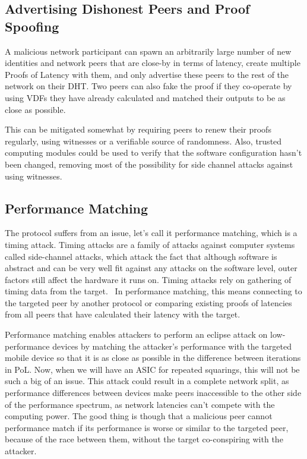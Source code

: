 \subsection{Advertising Dishonest Peers and Proof Spoofing}
A malicious network participant can spawn an arbitrarily large number of new identities and network peers that are close-by in terms of latency, create multiple Proofs of Latency with them, and only advertise these peers to the rest of the network on their DHT. Two peers can also fake the proof if they co-operate by using VDFs they have already calculated and matched their outputs to be as close as possible.

This can be mitigated somewhat by requiring peers to renew their proofs regularly, using witnesses or a verifiable source of randomness. Also, trusted computing modules could be used to verify that the software configuration hasn't been changed, removing most of the possibility for side channel attacks against using witnesses.

\subsection{Performance Matching}
The protocol suffers from an issue, let's call it performance matching, which is a timing attack. Timing attacks are a family of attacks against computer systems called side-channel attacks, which attack the fact that although software is abstract and can be very well fit against any attacks on the software level, outer factors still affect the hardware it runs on. Timing attacks rely on gathering of timing data from the target.~\cite{noauthor_undated-mp} In performance matching, this means connecting to the targeted peer by another protocol or comparing existing proofs of latencies from all peers that have calculated their latency with the target.

Performance matching enables attackers to perform an eclipse attack on low-performance devices by matching the attacker's performance with the targeted mobile device so that it is as close as possible in the difference between iterations in PoL. Now, when we will have an ASIC for repeated squarings, this will not be such a big of an issue. This attack could result in a complete network split, as performance differences between devices make peers inaccessible to the other side of the performance spectrum, as network latencies can't compete with the computing power. The good thing is though that a malicious peer cannot performance match if its performance is worse or similar to the targeted peer, because of the race between them, without the target co-conspiring with the attacker.


